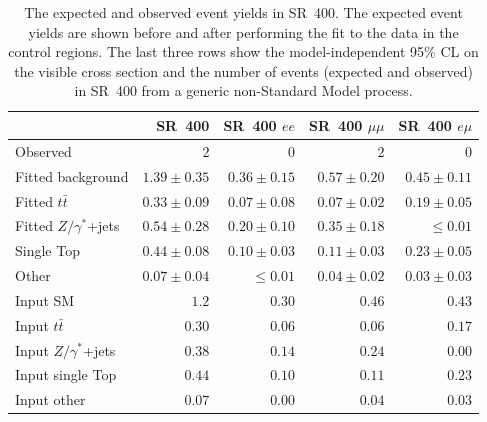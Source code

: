\begin{table}
  \caption{The expected and observed event yields in SR~400. The expected event
    yields are shown before and after performing the fit to the data in the
    control regions.
    The last three rows show the model-independent 95\% CL on
    the visible cross section and the number of events (expected and observed)
    in SR~400 from a generic non-Standard Model process.
  }
  \label{tab:event_yields_sr_400}
  \begin{center}
    \begin{tabular}{lrrrr}
      \toprule
                                    & SR~400                & SR~400 $ee$           & SR~400 $\mu\mu$       & SR~400 $e\mu$  \\
      \midrule
      Observed                      & $2$                   & $0$                   & $2$                   & $0$                \\
      \midrule
      Fitted background             & $1.39 \pm 0.35$       & $0.36 \pm 0.15$       & $0.57 \pm 0.20$       & $0.45 \pm 0.11$    \\
      \midrule
      Fitted $t\bar{t}$             & $0.33 \pm 0.09$       & $0.07 \pm 0.08$       & $0.07 \pm 0.02$       & $0.19 \pm 0.05$    \\
      Fitted $Z/\gamma^{*}$+jets    & $0.54 \pm 0.28$       & $0.20 \pm 0.10$       & $0.35 \pm 0.18$       & $\leq 0.01$    \\
      Single Top                    & $0.44 \pm 0.08$       & $0.10 \pm 0.03$       & $0.11 \pm 0.03$       & $0.23 \pm 0.05$    \\
      Other                         & $0.07 \pm 0.04$       & $\leq 0.01$           & $0.04 \pm 0.02$       & $0.03 \pm 0.03$    \\
      \midrule
      Input SM                      & $1.2$                 & $0.30$                & $0.46$                & $0.43$             \\
      \midrule
      Input $t\bar{t}$              & $0.30$                & $0.06$                & $0.06$                & $0.17$             \\
      Input $Z/\gamma^{*}$+jets     & $0.38$                & $0.14$                & $0.24$                & $0.00$             \\
      Input single Top              & $0.44$                & $0.10$                & $0.11$                & $0.23$             \\
      Input other                   & $0.07$                & $0.00$                & $0.04$                & $0.03$             \\

\end{tabular}
\end{center}
\end{table}
